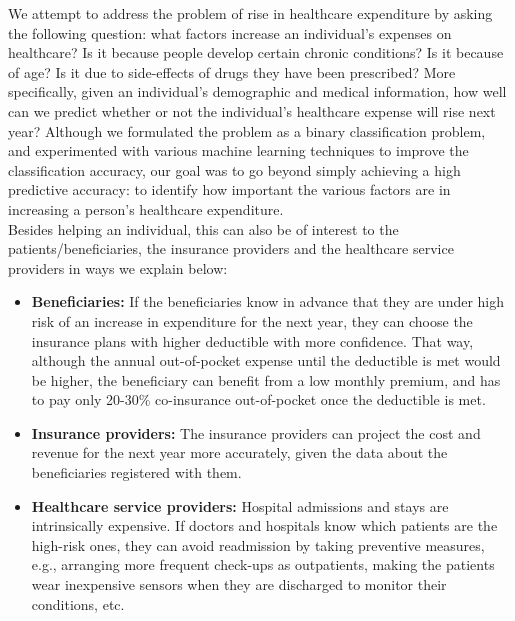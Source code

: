 We attempt to address the problem of rise in healthcare expenditure by asking the following question: what factors increase an individual's expenses on healthcare? Is it because people develop certain chronic conditions? Is it because of age? Is it due to side-effects of drugs they have been prescribed? More specifically, given an individual's demographic and medical information, how well can we predict whether or not the individual's healthcare expense will rise next year? Although we formulated the problem as a binary classification problem, and experimented with various machine learning techniques to improve the classification accuracy, our goal was to go beyond simply achieving a high predictive accuracy: to identify how important the various factors are in increasing a person's healthcare expenditure.\\

Besides helping an individual, this can also be of interest to the patients/beneficiaries, the insurance providers and the healthcare service providers in ways we explain below:
\begin{itemize}
\item {\bf Beneficiaries:} If the beneficiaries know in advance that they are under high risk of an increase in expenditure for the next year, they can choose the insurance plans with higher deductible with more confidence. That way, although the annual out-of-pocket expense until the deductible is met would be higher, the beneficiary can benefit from a low monthly premium, and has to pay only 20-30\% co-insurance out-of-pocket once the deductible is met. 
\item {\bf Insurance providers:} The insurance providers can project the cost and revenue for the next year more accurately, given the data about the beneficiaries registered with them.
\item {\bf Healthcare service providers:} Hospital admissions and stays are intrinsically expensive. If doctors and hospitals know which patients are the high-risk ones, they can avoid readmission by taking preventive measures, e.g., arranging more frequent check-ups as outpatients, making the patients wear inexpensive sensors when they are discharged to monitor their conditions, etc.
\end{itemize}

